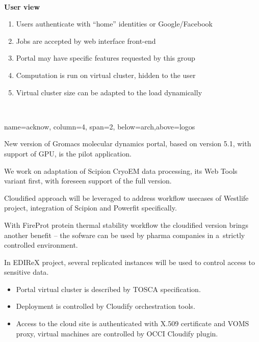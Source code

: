\documentclass[portrait,final,a0paper,fontscale=0.27]{baposter}
\begin{document}
\begin{poster}
{\begin{multicols}
\vfill
\columnbreak

\ 

\columnbreak

\raggedright
\textbf{User view}
\begin{enumerate}
\item Users authenticate with ``home'' identities or Google/Facebook
\item Jobs are accepted by web interface front-end
\item Portal may have specific features requested by this group
\item Computation is run on virtual cluster, hidden to the user
\item Virtual cluster size can be adapted to the load dynamically

\end{enumerate}
\vfill
\ 
\end{multicols}
}

%
{name=acknow, column=4, span=2, below=arch,above=logos}%
{ 
New version of \alert{Gromacs} molecular dynamics portal, based on \alert{version 5.1},
with support of GPU, is the pilot application.

\medskip
We work on adaptation of \alert{Scipion} CryoEM data processing, its Web Tools variant first, with foreseen support of the full version.

\medskip
Cloudified approach will be leveraged to address \alert{workflow usecases} of Westlife project,
integration of Scipion and Powerfit specifically.

\medskip
With \alert{FireProt} protein thermal stability workflow the cloudified version brings another benefit
-- the sofware can be used by \alert{pharma companies} in a~strictly controlled environment.

\medskip
In \alert{EDIReX project}, several replicated instances will be used to control
access to \alert{sensitive data}.

}

{
\begin{itemize}

\item Portal virtual cluster is described by \alert{TOSCA} specification.

\item Deployment is controlled by \alert{Cloudify} orchestration tools.

\item Access to the cloud site is authenticated with \alert{X.509 certificate} and \alert{VOMS proxy}, 
virtual machines are controlled by \alert{OCCI} Cloudify plugin.


\end{itemize}}
\end{poster}
\end{document}
